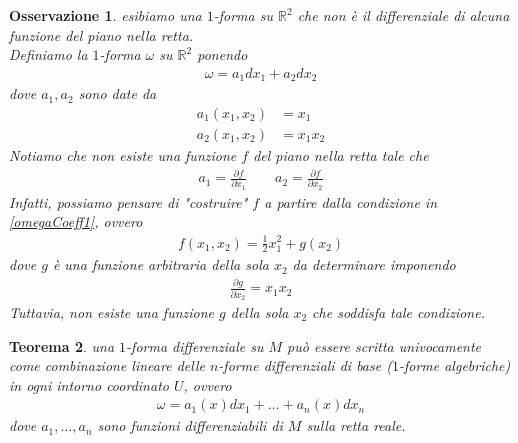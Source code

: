 \documentclass[oneside, 11pt]{amsbook}
\newcommand{\0}{{(0)}}
\newcommand{\3}{{(3)}}
\theoremstyle{colonplain}
\newtheorem{thm}{Teorema}[chapter]
\theoremstyle{colondefinition}
\theoremstyle{colonremark}
\newtheorem{rmk}[thm]{Osservazione}
\numberwithin{equation}{chapter}
\begin{document}
\begin{rmk} esibiamo una $1$-forma su $\mathbb{R}^2$ che non è il differenziale di alcuna funzione del piano nella retta. \\
Definiamo la $1$-forma $\omega$ su $\mathbb{R}^2$ ponendo
\begin{align}
    \omega = a_1dx_1 + a_2dx_2
\end{align}
dove $a_1, a_2$ sono date da 
\begin{align}\label{omegaCoeff1}
    a_1(x_1, x_2) &= x_1 \\
    a_2(x_1, x_2) &= x_1x_2
\end{align}
Notiamo che non esiste una funzione $f$ del piano nella retta tale che 
\begin{align}
    a_1 = \frac{\partial f}{\partial x_1} \qquad a_2 = \frac{\partial f}{\partial x_2}
\end{align}
Infatti, possiamo pensare di "costruire" $f$ a partire dalla condizione in \eqref{omegaCoeff1}, ovvero
\begin{align}
    f(x_1, x_2) = \frac{1}{2}x^2_1 + g(x_2)
\end{align}
dove $g$ è una funzione arbitraria della sola $x_2$ da determinare imponendo
\begin{align}
    \frac{\partial g}{\partial x_2} = x_1x_2
\end{align}
Tuttavia, non esiste una funzione $g$ della sola $x_2$ che soddisfa tale condizione.
\end{rmk}
\begin{thm}\label{LocalCoordDiffForm} una $1$-forma differenziale su $M$ può essere scritta univocamente come combinazione lineare delle $n$-forme differenziali di base ($1$-forme algebriche) in ogni intorno coordinato $U$, ovvero
\begin{align}
    \omega = a_1(x)dx_1 + \dots + a_n(x)dx_n
\end{align}
dove $a_1, \dots, a_n$ sono funzioni differenziabili di $M$ sulla retta reale.
\end{thm}
\end{document}
